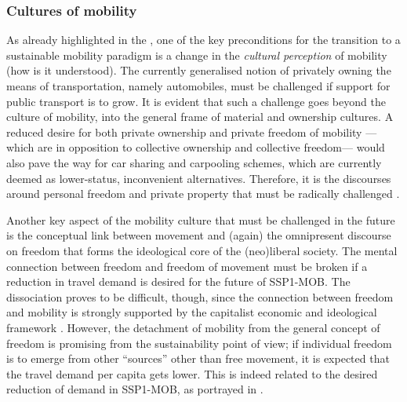 \subsubsection*{Cultures of mobility}
As already highlighted in the , one of the key preconditions for the transition to a sustainable mobility paradigm is a change in the \emph{cultural perception} of mobility (how is it understood). The currently generalised notion of privately owning the means of transportation, namely automobiles, must be challenged if support for public transport is to grow. It is evident that such a challenge goes beyond the culture of mobility, into the general frame of material and ownership cultures. A reduced desire for both private ownership and private freedom of mobility ---which are in opposition to collective ownership and collective freedom--- would also pave the way for car sharing and carpooling schemes, which are currently deemed as lower-status, inconvenient alternatives. Therefore, it is the discourses around personal freedom and private property that must be radically challenged \parencite{zijlstra2012_SocioSpatialPerspective}.

Another key aspect of the mobility culture that must be challenged in the future is the conceptual link between movement and (again) the omnipresent discourse on freedom that forms the ideological core of the (neo)liberal society. The mental connection between freedom and freedom of movement must be broken if a reduction in travel demand is desired for the future of SSP1-MOB. The dissociation proves to be difficult, though, since the connection between freedom and mobility is strongly supported by the capitalist economic and ideological framework \parencite{freudendal-pedersen2009_MobilityDailyLife,sheller2012_EmergenceNewCultures}. However, the detachment of mobility from the general concept of freedom is promising from the sustainability point of view; if individual freedom is to emerge from other ``sources'' other than free movement, it is expected that the travel demand per capita gets lower. This is indeed related to the desired reduction of demand in SSP1-MOB, as portrayed in .

